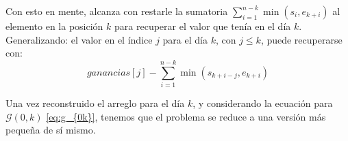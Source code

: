     Con esto en mente, alcanza con restarle la sumatoria 
$\sum_{i=1}^{n-k} \min (s_i, e_{k+i})$ al elemento en la posici\'on $k$ para
recuperar el valor que ten\'ia en el d\'ia $k$.\\
Generalizando: el valor en el \'indice $j$ para el d\'ia $k$, con $j \leq k$,
puede recuperarse con:
\begin{equation*}
    ganancias[j] - \sum_{i=1}^{n-k} \min (s_{k+i-j}, e_{k+i})
\end{equation*}

    Una vez reconstruido el arreglo para el d\'ia $k$, y considerando la
ecuaci\'on para $\mathcal{G} ( 0, k )$ \eqref{eq:g_{0k}}, tenemos que el problema
se reduce a una versi\'on m\'as peque\~na de s\'i mismo. 
